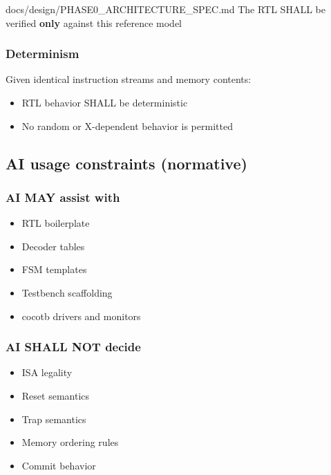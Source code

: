 \begin{relocated}{docs/design/PHASE0_ARCHITECTURE_SPEC.md}
The RTL SHALL be verified \textbf{only} against this reference model

\subsubsection{Determinism}\label{ds:ch:phase0-architecture:determinism}

Given identical instruction streams and memory contents:

\begin{itemize}
\tightlist
\item
  RTL behavior SHALL be deterministic
\item
  No random or X-dependent behavior is permitted
\end{itemize}

\subsection{AI usage constraints (normative)}\label{ds:ch:phase0-architecture:ai-usage-constraints-normative}

\subsubsection{AI MAY assist with}\label{ds:ch:phase0-architecture:ai-may-assist-with}

\begin{itemize}
\tightlist
\item
  RTL boilerplate
\item
  Decoder tables
\item
  FSM templates
\item
  Testbench scaffolding
\item
  cocotb drivers and monitors
\end{itemize}

\subsubsection{AI SHALL NOT decide}\label{ds:ch:phase0-architecture:ai-shall-not-decide}

\begin{itemize}
\tightlist
\item
  ISA legality
\item
  Reset semantics
\item
  Trap semantics
\item
  Memory ordering rules
\item
  Commit behavior
\end{itemize}


\end{relocated}
